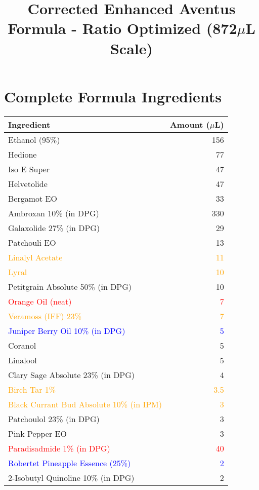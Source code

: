 \documentclass{article}
\title{Corrected Enhanced Aventus Formula - Ratio Optimized (872$\mu$L Scale)}
\author{}
\date{}
\begin{document}
\maketitle

\section{Complete Formula Ingredients}

\begin{table}[h]
\centering
\begin{tabular}{lr}
\toprule
\textbf{Ingredient} & \textbf{Amount ($\mu$L)} \\
\midrule
Ethanol (95\%) & 156 \\
Hedione & 77 \\
Iso E Super & 47 \\
Helvetolide & 47 \\
Bergamot EO & 33 \\
Ambroxan 10\% (in DPG) & 330 \\
Galaxolide 27\% (in DPG) & 29 \\
Patchouli EO & 13 \\
\textcolor{orange}{Linalyl Acetate} & \textcolor{orange}{11} \\
\textcolor{orange}{Lyral} & \textcolor{orange}{10} \\
Petitgrain Absolute 50\% (in DPG) & 10 \\
\textcolor{red}{Orange Oil (neat)} & \textcolor{red}{7} \\
\textcolor{orange}{Veramoss (IFF) 23\%} & \textcolor{orange}{7} \\
\textcolor{blue}{Juniper Berry Oil 10\% (in DPG)} & \textcolor{blue}{5} \\
Coranol & 5 \\
Linalool & 5 \\
Clary Sage Absolute 23\% (in DPG) & 4 \\
\textcolor{orange}{Birch Tar 1\%} & \textcolor{orange}{3.5} \\
\textcolor{orange}{Black Currant Bud Absolute 10\% (in IPM)} & \textcolor{orange}{3} \\
Patchoulol 23\% (in DPG) & 3 \\
Pink Pepper EO & 3 \\
\textcolor{red}{Paradisadmide 1\% (in DPG)} & \textcolor{red}{40} \\
\textcolor{blue}{Robertet Pineapple Essence (25\%)} & \textcolor{blue}{2} \\
2-Isobutyl Quinoline 10\% (in DPG) & 2 \\

\end{tabular}
\end{table}
\end{document}
